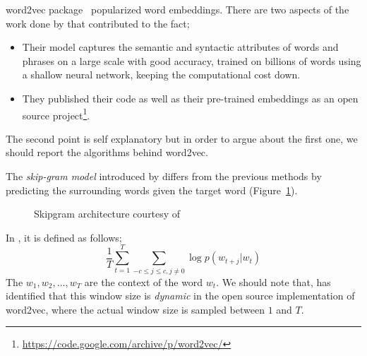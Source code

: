 word2vec package~\cite{mikolov_efficient_2013,mikolov_distributed_2013,mikolov_linguistic_2013} popularized word embeddings.
There are two aspects of the work done by \citeauthor{mikolov_distributed_2013}  that contributed to the fact;
\begin{itemize}
    \item Their model captures the semantic and syntactic attributes of words and phrases on a large scale with good accuracy, trained on billions of words using a shallow neural network, keeping the computational cost down.
    \item They published their code as well as their pre-trained embeddings as an open source project\footnote{\url{https://code.google.com/archive/p/word2vec/}}.
\end{itemize}
The second point is self explanatory but in order to argue about the first one, we should report the algorithms behind word2vec.

The \emph{skip-gram model} introduced by \textcite{mikolov_efficient_2013} differs from the previous methods by predicting the surrounding words given the target word (Figure~\ref{fig:skipgram}).
\begin{figure}[ht]
    \centering
    \caption{Skipgram architecture courtesy of \textcite{mikolov_distributed_2013}}%
    \label{fig:skipgram}
\end{figure}
In , it is defined as follows;
\begin{equation}
    \frac{1}{T}\sum_{t=1}^{T}\sum_{-c \leq j \leq c, j \neq 0} \log p(w_{t+j}|w_t)
\end{equation}
The $w_{1}, w_{2}, \dots, w_{T}$ are the context of the word $w_t$.
We should note that, \textcite{levy_improving_2015} has identified that this window size is \emph{dynamic} in the open source implementation of word2vec, where the actual window size is sampled between $1$ and $T$.


